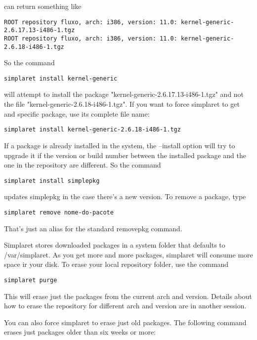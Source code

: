 \documentclass{article}
\begin{document}
can return something like

\begin{verbatim}
ROOT repository fluxo, arch: i386, version: 11.0: kernel-generic-2.6.17.13-i486-1.tgz
ROOT repository fluxo, arch: i386, version: 11.0: kernel-generic-2.6.18-i486-1.tgz
\end{verbatim}

So the command

\begin{verbatim}
simplaret install kernel-generic
\end{verbatim}

will attempt to install the package "kernel-generic-2.6.17.13-i486-1.tgz" and not the file "kernel-generic-2.6.18-i486-1.tgz". If you want to force simplaret to get and specific package, use its complete file name:

\begin{verbatim}
simplaret install kernel-generic-2.6.18-i486-1.tgz
\end{verbatim}

If a package is already installed in the system, the --install option will try to upgrade it if the version or build number between the installed package and the one in the repository are different. So the command

\begin{verbatim}
simplaret install simplepkg
\end{verbatim}

updates simplepkg in the case there's a new version. To remove a package, type

\begin{verbatim}
simplaret remove nome-do-pacote
\end{verbatim}

That's just an alias for the standard removepkg command.

Simplaret stores downloaded packages in a system folder that defaults to /var/simplaret.  As you get more and more packages, simplaret will consume more space ir your disk. To erase your local repository folder, use the command

\begin{verbatim}
simplaret purge
\end{verbatim}

This will erase just the packages from the current arch and version. Details about how to erase the repository for different arch and version are in another session.

You can also force simplaret to erase just old packages. The following command erases just packages older than six weeks or more:
\end{document}
